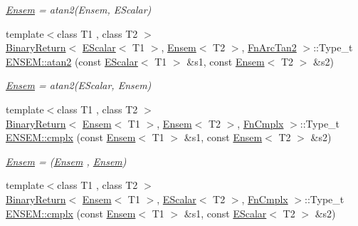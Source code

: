\begin{DoxyCompactItemize}
\begin{DoxyCompactList}\small\item\em \mbox{\hyperlink{classENSEM_1_1Ensem}{Ensem}} = atan2(\+Ensem, E\+Scalar) \end{DoxyCompactList}\item 
{\footnotesize template$<$class T1 , class T2 $>$ }\\\mbox{\hyperlink{structENSEM_1_1BinaryReturn}{Binary\+Return}}$<$ \mbox{\hyperlink{classENSEM_1_1EScalar}{E\+Scalar}}$<$ T1 $>$, \mbox{\hyperlink{classENSEM_1_1Ensem}{Ensem}}$<$ T2 $>$, \mbox{\hyperlink{structENSEM_1_1FnArcTan2}{Fn\+Arc\+Tan2}} $>$\+::Type\+\_\+t \mbox{\hyperlink{group__eensem_ga04b957edb43f4b1eee36cecfac095807}{E\+N\+S\+E\+M\+::atan2}} (const \mbox{\hyperlink{classENSEM_1_1EScalar}{E\+Scalar}}$<$ T1 $>$ \&s1, const \mbox{\hyperlink{classENSEM_1_1Ensem}{Ensem}}$<$ T2 $>$ \&s2)
\begin{DoxyCompactList}\small\item\em \mbox{\hyperlink{classENSEM_1_1Ensem}{Ensem}} = atan2(\+E\+Scalar, Ensem) \end{DoxyCompactList}\item 
{\footnotesize template$<$class T1 , class T2 $>$ }\\\mbox{\hyperlink{structENSEM_1_1BinaryReturn}{Binary\+Return}}$<$ \mbox{\hyperlink{classENSEM_1_1Ensem}{Ensem}}$<$ T1 $>$, \mbox{\hyperlink{classENSEM_1_1Ensem}{Ensem}}$<$ T2 $>$, \mbox{\hyperlink{structENSEM_1_1FnCmplx}{Fn\+Cmplx}} $>$\+::Type\+\_\+t \mbox{\hyperlink{group__eensem_gaed2aa58870f554b9ad30212f8d25ca46}{E\+N\+S\+E\+M\+::cmplx}} (const \mbox{\hyperlink{classENSEM_1_1Ensem}{Ensem}}$<$ T1 $>$ \&s1, const \mbox{\hyperlink{classENSEM_1_1Ensem}{Ensem}}$<$ T2 $>$ \&s2)
\begin{DoxyCompactList}\small\item\em \mbox{\hyperlink{classENSEM_1_1Ensem}{Ensem}} = (\mbox{\hyperlink{classENSEM_1_1Ensem}{Ensem}} , \mbox{\hyperlink{classENSEM_1_1Ensem}{Ensem}}) \end{DoxyCompactList}\item 
{\footnotesize template$<$class T1 , class T2 $>$ }\\\mbox{\hyperlink{structENSEM_1_1BinaryReturn}{Binary\+Return}}$<$ \mbox{\hyperlink{classENSEM_1_1Ensem}{Ensem}}$<$ T1 $>$, \mbox{\hyperlink{classENSEM_1_1EScalar}{E\+Scalar}}$<$ T2 $>$, \mbox{\hyperlink{structENSEM_1_1FnCmplx}{Fn\+Cmplx}} $>$\+::Type\+\_\+t \mbox{\hyperlink{group__eensem_gadd471503e7ac8d60fb8a955e1999f6fa}{E\+N\+S\+E\+M\+::cmplx}} (const \mbox{\hyperlink{classENSEM_1_1Ensem}{Ensem}}$<$ T1 $>$ \&s1, const \mbox{\hyperlink{classENSEM_1_1EScalar}{E\+Scalar}}$<$ T2 $>$ \&s2)

\end{DoxyCompactItemize}
